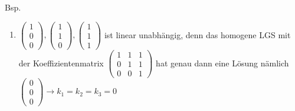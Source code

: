 \documentclass{scrartcl}
\begin{document}
	Bsp. \begin{enumerate}
		\item
		$\begin{pmatrix}
			1 \\ 0 \\ 0
		\end{pmatrix},
		\begin{pmatrix}
			 1 \\ 1 \\ 0
		\end{pmatrix}, 
		\begin{pmatrix}
			1 \\ 1 \\ 1
		\end{pmatrix}$ ist linear unabhängig, denn das homogene LGS mit der Koeffizientenmatrix $\begin{pmatrix}
		1 & 1 & 1 \\ 0 & 1 & 1 \\ 0 & 0 & 1
		\end{pmatrix}$ hat genau dann eine Lösung nämlich $\begin{pmatrix}
			0 \\ 0 \\ 0
		\end{pmatrix} \rightarrow k_1 = k_2 = k_3 = 0$
		

\end{enumerate}
\end{document}
